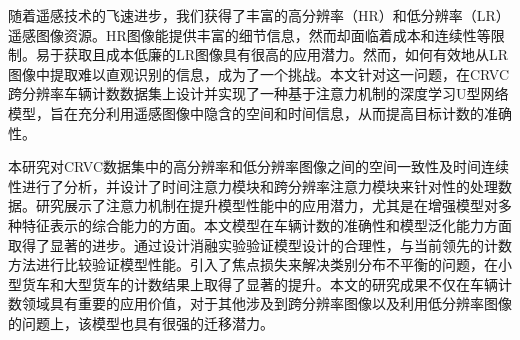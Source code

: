 
随着遥感技术的飞速进步，我们获得了丰富的高分辨率（HR）和低分辨率（LR）遥感图像资源。HR图像能提供丰富的细节信息，然而却面临着成本和连续性等限制。易于获取且成本低廉的LR图像具有很高的应用潜力。然而，如何有效地从LR图像中提取难以直观识别的信息，成为了一个挑战。本文针对这一问题，在CRVC跨分辨率车辆计数数据集上设计并实现了一种基于注意力机制的深度学习U型网络模型，旨在充分利用遥感图像中隐含的空间和时间信息，从而提高目标计数的准确性。

本研究对CRVC数据集中的高分辨率和低分辨率图像之间的空间一致性及时间连续性进行了分析，并设计了时间注意力模块和跨分辨率注意力模块来针对性的处理数据。研究展示了注意力机制在提升模型性能中的应用潜力，尤其是在增强模型对多种特征表示的综合能力的方面。本文模型在车辆计数的准确性和模型泛化能力方面取得了显著的进步。通过设计消融实验验证模型设计的合理性，与当前领先的计数方法进行比较验证模型性能。引入了焦点损失来解决类别分布不平衡的问题，在小型货车和大型货车的计数结果上取得了显著的提升。本文的研究成果不仅在车辆计数领域具有重要的应用价值，对于其他涉及到跨分辨率图像以及利用低分辨率图像的问题上，该模型也具有很强的迁移潜力。

